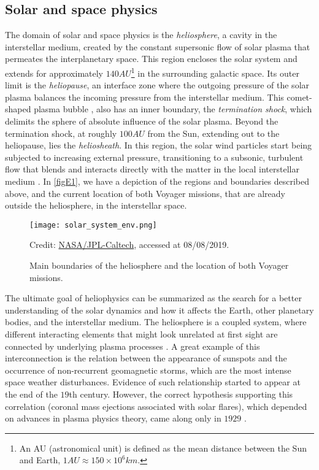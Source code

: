 \documentclass[12pt,a4paper,ruledheader]{report}
\begin{document}
\begin{appendix}
\section{Solar and space physics}
\label{sec:solar-physics}
The domain of solar and space physics is the \emph{heliosphere}, a cavity
in the interstellar medium, created by the constant supersonic flow of solar
plasma that permeates the interplanetary space. This region encloses the
solar system and extends for approximately $140\unit{AU}$\footnote{An AU
  (astronomical unit) is defined as the mean distance between the Sun and
  Earth, $1\unit{AU}\approx 150\times 10^6\unit{km}$.} in the surrounding
galactic space. Its outer limit is the \emph{heliopause}, an interface
zone where the outgoing pressure of the solar plasma balances the incoming
pressure from the interstellar medium. This comet-shaped plasma bubble
\cite{Dialynas2017}, also has an inner boundary, the \emph{termination shock},
which delimits the sphere of absolute influence of the solar plasma. Beyond
the termination shock, at roughly $100\unit{AU}$ from the Sun, extending
out to the heliopause, lies the \emph{heliosheath}. In this region, the
solar wind particles start being subjected to increasing external pressure,
transitioning to a subsonic, turbulent flow that blends and interacts
directly with the matter in the local interstellar medium \cite{NAP13060}.
In \autoref{figE1}, we have a depiction of the regions and boundaries
described above, and the current location of both Voyager missions, that
are already outside the heliosphere, in the interstellar space.
\begin{figure}[h]
  \begin{center}
    \texttt{[image: solar\_system\_env.png]}
    \caption{Main boundaries of the heliosphere and the location of both
      Voyager missions.}
      {\footnotesize Credit:}
      \href{https://voyager.jpl.nasa.gov/news/details.php?article_id=112}
      {\footnotesize NASA/JPL-Caltech}{\footnotesize , accessed at 08/08/2019.}
    \label{figE1}
  \end{center}
\end{figure}


The ultimate goal of heliophysics can be summarized as the search for a
better understanding of the solar dynamics and how it affects the Earth,
other planetary bodies, and the interstellar medium. The heliosphere is
a coupled system, where different interacting elements that might look
unrelated at first sight are connected by underlying plasma processes
\cite{NAP13060}. A great example of this interconnection is the relation
between the appearance of sunspots and the occurrence of non-recurrent
geomagnetic storms, which are the most intense space weather disturbances.
Evidence of such relationship started to appear at the end of the $19$th
century. However, the correct hypothesis supporting this correlation
(coronal mass ejections associated with solar flares), which depended
on advances in plasma physics theory, came along only in $1929$
\cite{chapman1929cosmical,Koskinen2011}.


\end{appendix}
\end{document}
